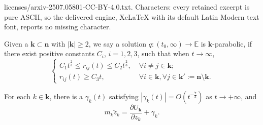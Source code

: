 \documentclass[10pt,a4paper]{amsart}
\newcommand{\be}{\mathbb E}
\newcommand{\bk}{\mathbf k}
\newcommand{\bn}{\mathbf n}
\newcommand{\gm}{\gamma}
\newcommand{\se}{\frac{2}{3}}
\begin{document}
licenses/arxiv-2507.05801-CC-BY-4.0.txt. Characters: every retained excerpt is pure ASCII, so the delivered engine, XeLaTeX with its default Latin Modern text font, reports no missing character.
\begin{definition}
\label{df;k-para} Given a $\bk \subset \bn$ with $|\bk| \ge 2$, we say a solution $q: (t_0, \infty) \to \be$ is $\bk$-parabolic, if there exist positive constants $C_i$, $i =1, 2, 3$, such that when $t \to \infty$, 
$$ 
\begin{cases}
C_1 t^{\se} \le r_{ij}(t) \le C_2 t^{\se}, & \; \forall i \ne j \in \bk; \\
r_{ij}(t) \ge C_3 t, & \; \forall i \in \bk, \forall j \in \bk':= \bn \setminus \bk.
\end{cases} 
$$
\end{definition}

\begin{lemma}\label{lem;mut-dis}
    For each $k\in\mathbf{k}$, there is a $\gm_k(t)$ satisfying  $|\gamma_k(t)|=O(t^{-\frac{7}{3}})$ as $t\rightarrow+\infty$, and 
    \begin{equation}\label{eq;mutal-dist-eq}
        m_k\ddot{z}_k=\frac{\partial U_\mathbf{k}}{\partial z_k}+\gamma_k.
    \end{equation}
\end{lemma}
\end{document}
